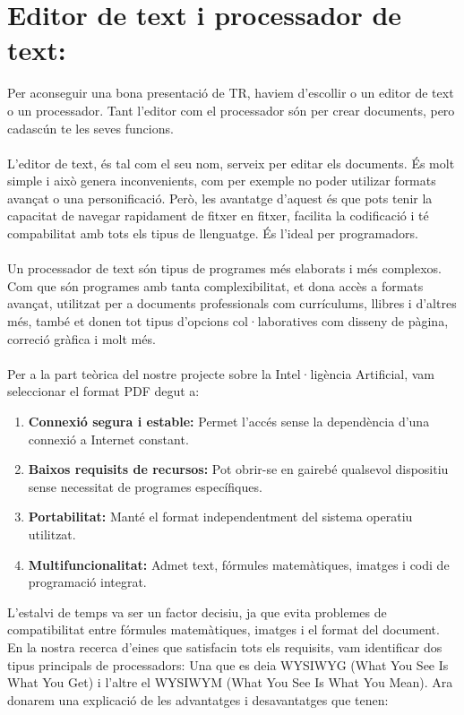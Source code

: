  \section{Editor de text i processador de text: }\label{sec:4.2}
 Per aconseguir una bona presentació de TR, haviem d'escollir o un editor de text o un processador. Tant l'editor com el processador són per crear documents, pero cadascún te les seves funcions.\\ \\
 L'editor de text, és tal com el seu nom, serveix per editar els documents. És molt simple i això genera inconvenients, com per exemple no poder utilizar formats avançat o una personificació. Però, les avantatge d'aquest és que pots tenir la capacitat de navegar rapidament de fitxer en fitxer, facilita la codificació i té compabilitat amb tots els tipus de llenguatge. És l'ideal per programadors.\\ \\
 Un processador de text són tipus de programes més elaborats i més complexos. Com que són programes amb tanta complexibilitat, et dona accès a formats avançat, utilitzat per a documents professionals com currículums, llibres i d'altres més, també et donen tot tipus d'opcions col·laboratives com disseny de pàgina, correció gràfica i molt més.\\ \\
 Per a la part teòrica del nostre projecte sobre la Intel·ligència Artificial, vam seleccionar el format PDF degut a:
    \begin{enumerate}
      \item \textbf{Connexió segura i estable:} Permet l'accés sense la dependència d'una connexió a Internet constant.
      \item \textbf{Baixos requisits de recursos:} Pot obrir-se en gairebé qualsevol dispositiu sense necessitat de programes específiques.
      \item \textbf{Portabilitat:} Manté el format independentment del sistema operatiu utilitzat.
      \item \textbf{Multifuncionalitat:} Admet text, fórmules matemàtiques, imatges i codi de programació integrat.
    \end{enumerate}
  L'estalvi de temps va ser un factor decisiu, ja que evita problemes de compatibilitat entre fórmules matemàtiques, imatges i el format del document.
  En la nostra recerca d'eines que satisfacin tots els requisits, vam identificar dos tipus principals de processadors: Una que es deia WYSIWYG (What You See Is What You Get) i l'altre el WYSIWYM (What You See Is What You Mean). Ara donarem una explicació de les advantatges i desavantatges que tenen:

